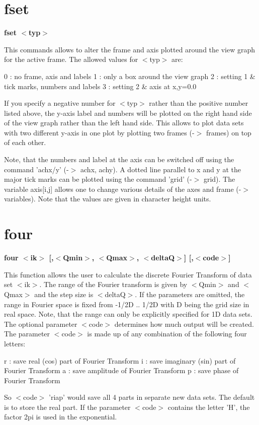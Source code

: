\section{fset}
{\bf fset $ <$typ$> $ \par }
\par
\vspace{3pt}
This commands allows to alter the frame and axis plotted around 
the view graph for the active frame. The allowed values for $ <$typ$> $ 
are: 
\par
\begin{MacVerbatim}
  0 : no frame, axis and labels
  1 : only a box around the view graph
  2 : setting 1 & tick marks, numbers and labels
  3 : setting 2 & axis at x,y=0.0
\end{MacVerbatim}
If you specify a negative number for $ <$typ$> $ rather than the positive 
number listed above, the y-axis label and numbers will be plotted 
on the right hand side of the view graph rather than the left hand 
side. This allows to plot data sets with two different y-axis in 
one plot by plotting two frames (-$> $ frames) on top of each other. 
\par
Note, that the numbers and label at the axis can be switched off 
using the command 'achx/y' (-$> $ achx, achy). A dotted line parallel 
to x and y at the major tick marks can be plotted using the command 
'grid' (-$> $ grid). The variable axis[i,j] allows one to change 
various details of the axes and frame (-$> $ variables). Note that the 
values are given in character height units. 
\section{four}
{\bf four $ <$ik$> $ [,$ <$Qmin$> $, $ <$Qmax$> $, $ <$deltaQ$> $] [,$ <$code$> $] \par }
\par
\vspace{3pt}
This function allows the user to calculate the discrete Fourier 
Transform of data set $ <$ik$> $. The range of the Fourier transform is 
given by $ <$Qmin$> $ and $ <$Qmax$> $ and the step size is $ <$deltaQ$> $. If the 
parameters are omitted, the range in Fourier space is fixed 
from -1/2D .. 1/2D with D being the grid size in real space. Note, 
that the range can only be explicitly specified for 1D data sets. The 
optional parameter $ <$code$> $ determines how much output will be 
created. The parameter $ <$code$> $ is made up of any combination of the 
following four letters: 
\par
\begin{MacVerbatim}
  r   : save real (cos) part of Fourier Transform
  i   : save imaginary (sin) part of Fourier Transform
  a   : save amplitude of Fourier Transform
  p   : save phase of Fourier Transform
\end{MacVerbatim}
So $ <$code$> $ 'riap' would save all 4 parts in separate new data sets. 
The default is to store the real part. If the parameter $ <$code$> $ 
contains the letter 'H', the factor 2pi is used in the exponential. 

